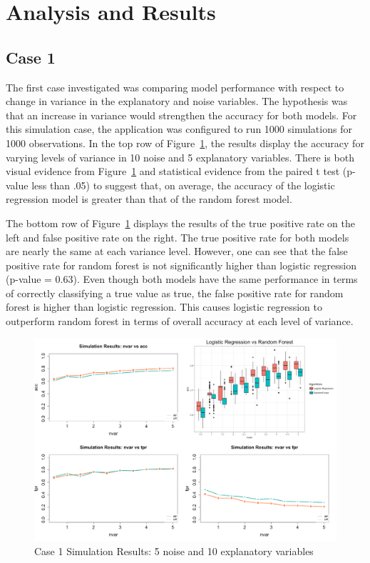 \documentclass{llncs}
\begin{document}
\section{Analysis and Results}

\subsection{Case 1}
The first case investigated was comparing model performance with respect to change in variance in the explanatory and noise variables. The hypothesis was that an increase in variance would strengthen the accuracy for both models. For this simulation case, the application was configured to run 1000 simulations for 1000 observations. In the top row of Figure~\ref{fig:case1results}, the results display the accuracy for varying levels of variance in 10 noise and 5 explanatory variables. There is both visual evidence from Figure~\ref{fig:case1results} and statistical evidence  from the paired t test (p-value less than .05) to suggest that, on average, the accuracy of the logistic regression model is  greater than that of the random forest model. 

The bottom row of Figure~\ref{fig:case1results} displays the results of the true positive rate on the left and false positive rate on the right. The true positive rate for both models are nearly the same at each variance level.  However, one can see that the false positive rate for random forest is not significantly higher than logistic regression (p-value = 0.63).  Even though both models have the same performance in terms of correctly classifying a true value as true, the false positive rate for random forest is higher than logistic regression.  This causes logistic regression to outperform random forest in terms of overall accuracy at each level of variance.

\begin{figure}
\centering
\includegraphics[scale=0.55]{case1.png}
\caption{Case 1 Simulation Results: 5 noise and 10 explanatory variables}
\label{fig:case1results}
\end{figure}
\end{document}

